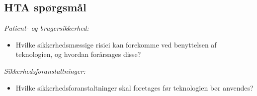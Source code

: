 \subsection{HTA spørgsmål}
\textit{Patient- og brugersikkerhed:}
\begin{itemize}
	\item Hvilke sikkerhedsmæssige risici kan forekomme ved benyttelsen af teknologien, og hvordan forårsages disse? %
\end{itemize}
\textit{Sikkerhedsforanstaltninger:}
\begin{itemize}
	\item Hvilke sikkerhedsforanstaltninger skal foretages før teknologien bør anvendes?  %
\end{itemize}

